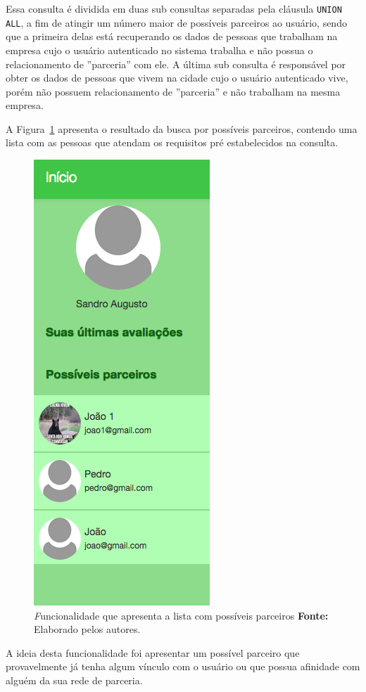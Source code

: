 Essa consulta é dividida em duas sub consultas separadas pela cláusula \texttt{UNION ALL}, a fim de atingir um número maior de possíveis parceiros ao usuário, sendo que a primeira delas está recuperando os dados de pessoas que trabalham na empresa cujo o usuário autenticado no sistema trabalha e não possua o relacionamento de ''parceria'' com ele. A última sub consulta é responsável por obter os dados de pessoas que vivem na cidade cujo o usuário autenticado vive, porém não possuem relacionamento de ''parceria'' e não trabalham na mesma empresa.

\par A Figura~\ref{fig:busca_possiveis_parceiros} apresenta o resultado da busca por possíveis parceiros, contendo uma lista com as pessoas que atendam os requisitos pré estabelecidos na consulta.

\begin{figure}[h!]
	\centerline{\includegraphics[scale=0.4]{./imagens/busca-possiveis-parceiros.png}}
	\caption[\textit Funcionalidade que apresenta a lista com possíveis parceiros]
	{\textit Funcionalidade que apresenta a lista com possíveis parceiros \textbf{Fonte:} Elaborado pelos autores.}
	\label{fig:busca_possiveis_parceiros}
\end{figure}

\par A ideia desta funcionalidade foi apresentar um possível parceiro que provavelmente já tenha algum vínculo com o usuário ou que possua afinidade com alguém da sua rede de parceria.